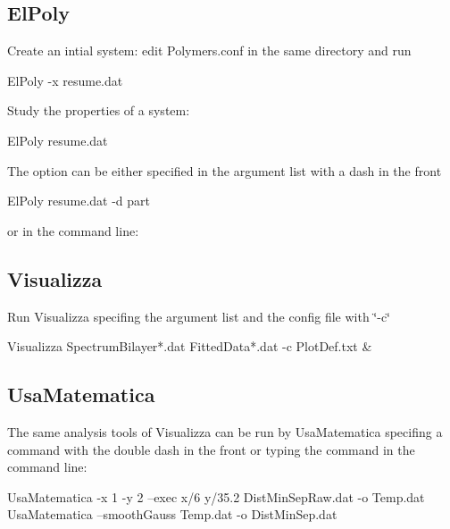 \hypertarget{usage_page_ElPoly_section}{}\subsection{\-El\-Poly}\label{usage_page_ElPoly_section}
\-Create an intial system\-: edit \-Polymers.\-conf in the same directory and run 
\begin{DoxyCode}
ElPoly -x resume.dat
\end{DoxyCode}
 \-Study the properties of a system\-: 
\begin{DoxyCode}
ElPoly resume.dat
\end{DoxyCode}
 \-The option can be either specified in the argument list with a dash in the front 
\begin{DoxyCode}
ElPoly resume.dat -d part
\end{DoxyCode}
 or in the command line\-: 
\hypertarget{usage_page_Visualizza_section}{}\subsection{\-Visualizza}\label{usage_page_Visualizza_section}
\-Run \-Visualizza specifing the argument list and the config file with \char`\"{}-\/c\char`\"{} 
\begin{DoxyCode}
Visualizza SpectrumBilayer*.dat FittedData*.dat -c PlotDef.txt &
\end{DoxyCode}
\hypertarget{usage_page_UsaMatematica_section}{}\subsection{\-Usa\-Matematica}\label{usage_page_UsaMatematica_section}
\-The same analysis tools of \-Visualizza can be run by \-Usa\-Matematica specifing a command with the double dash in the front or typing the command in the command line\-: 
\begin{DoxyCode}
UsaMatematica -x 1 -y 2 --exec x/6 y/35.2  DistMinSepRaw.dat -o Temp.dat
UsaMatematica --smoothGauss Temp.dat -o DistMinSep.dat
\end{DoxyCode}

